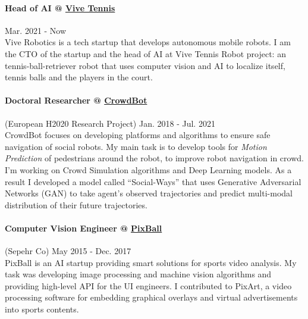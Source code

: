 \documentclass[10pt]{res}
\begin{document}
\begin{resume}
\paragraph{Head of AI @ \href{http://vivetennis.com} {Vive Tennis}} \hfill Mar. 2021 - Now\\
Vive Robotics is a tech startup that develops autonomous mobile robots. I am the CTO of the startup and the head of AI at Vive Tennis Robot project: an tennis-ball-retriever robot that uses computer vision and AI to localize itself, tennis balls and the players in the court. 

\paragraph{Doctoral Researcher @ \href{http://crowdbot.eu} {CrowdBot}}(European H2020 Research Project) \hfill Jan. 2018 - Jul. 2021\\
CrowdBot focuses on developing platforms and algorithms to ensure safe navigation of social robots.
My main task is to develop tools for \textit{Motion Prediction} of pedestrians around the robot, to improve robot navigation in crowd. I'm working on Crowd Simulation algorithms and Deep Learning models. As a result I developed a model called \enquote{Social-Ways} that uses Generative Adversarial Networks (GAN) to take agent's observed trajectories and predict multi-modal distribution of their future trajectories.

\paragraph{Computer Vision Engineer @ \href{http://pixballsports.com}{PixBall}} (Sepehr Co)  \hfill May 2015 - Dec. 2017\\
PixBall is an AI startup providing smart solutions for sports video analysis. My task was developing image processing and machine vision algorithms and providing high-level API for the UI engineers. I contributed to PixArt, a video processing software for embedding graphical overlays and virtual advertisements into sports contents. %


\end{resume}
\end{document}
